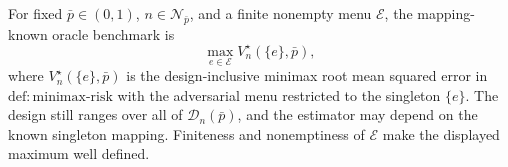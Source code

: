 For fixed \(\bar p\in(0,1)\), \(n\in\mathcal N_{\bar p}\), and a finite nonempty menu \(\mathcal E\), the mapping-known oracle benchmark is
\[
 \max_{e\in\mathcal E}V_n^\star(\{e\},\bar p),
\]
where \(V_n^\star(\{e\},\bar p)\) is the design-inclusive minimax root mean squared error in \(\mathrm{def{:}minimax\text{-}risk}\) with the adversarial menu restricted to the singleton \(\{e\}\). The design still ranges over all of \(\mathcal D_n(\bar p)\), and the estimator may depend on the known singleton mapping. Finiteness and nonemptiness of \(\mathcal E\) make the displayed maximum well defined.